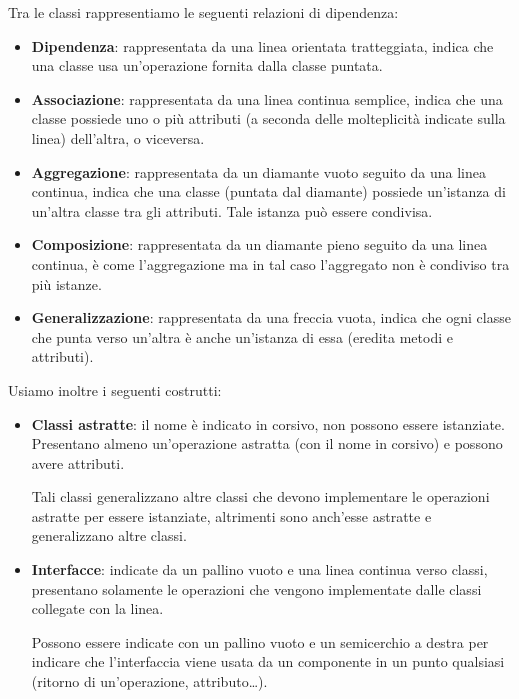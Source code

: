         Tra le classi rappresentiamo le seguenti relazioni di dipendenza:
        \begin{itemize}
            \item \textbf{Dipendenza}: rappresentata da una linea orientata tratteggiata, indica che una classe usa un'operazione fornita dalla classe puntata.
            \item \textbf{Associazione}: rappresentata da una linea continua semplice, indica che una classe possiede uno o più attributi (a seconda delle molteplicità indicate sulla linea) dell'altra, o viceversa.
            \item \textbf{Aggregazione}: rappresentata da un diamante vuoto seguito da una linea continua, indica che una classe (puntata dal diamante) possiede un'istanza di un'altra classe tra gli attributi. Tale istanza può essere condivisa.
            \item \textbf{Composizione}: rappresentata da un diamante pieno seguito da una linea continua, è come l'aggregazione ma in tal caso l'aggregato non è condiviso tra più istanze.
            \item \textbf{Generalizzazione}: rappresentata da una freccia vuota, indica che ogni classe che punta verso un'altra è anche un'istanza di essa (eredita metodi e attributi).
        \end{itemize}
        Usiamo inoltre i seguenti costrutti:
            \begin{itemize}
                \item \textbf{Classi astratte}: il nome è indicato in corsivo, non possono essere istanziate. Presentano almeno un'operazione astratta (con il nome in corsivo) e possono avere attributi.\par
                Tali classi generalizzano altre classi che devono implementare le operazioni astratte per essere istanziate, altrimenti sono anch'esse astratte e generalizzano altre classi.
                \item \textbf{Interfacce}: indicate da un pallino vuoto e una linea continua verso classi, presentano solamente le operazioni che vengono implementate dalle classi collegate con la linea.\par
                Possono essere indicate con un pallino vuoto e un semicerchio a destra per indicare che l'interfaccia viene usata da un componente in un punto qualsiasi (ritorno di un'operazione, attributo\dots).
            \end{itemize}



